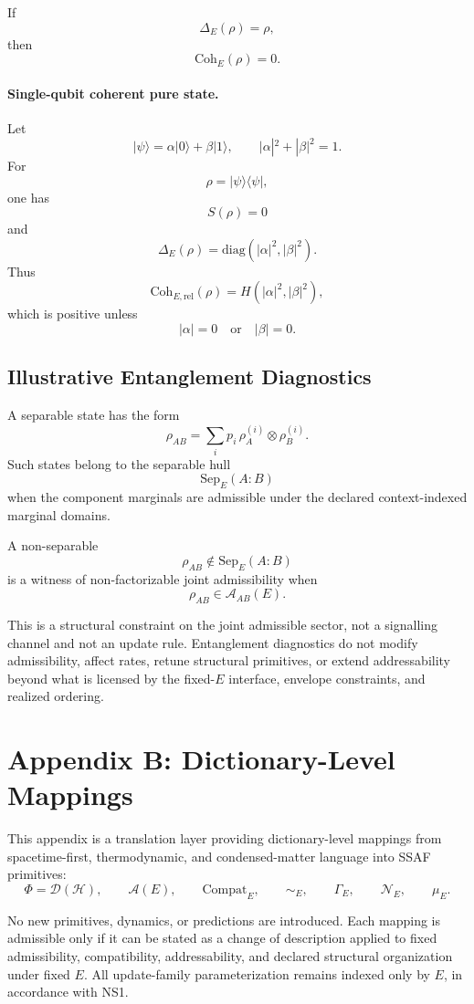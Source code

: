 \documentclass[aps,prx,onecolumn,11pt]{revtex4-2}
\theoremstyle{plain}
\theoremstyle{definition}
\theoremstyle{remark}
\begin{document}
If
\[
\Delta_E(\rho)=\rho,
\]
then
\[
\mathrm{Coh}_E(\rho)=0.
\]

\paragraph{Single-qubit coherent pure state.}

Let
\[
|\psi\rangle
=
\alpha|0\rangle+\beta|1\rangle,
\qquad
|\alpha|^2+|\beta|^2=1.
\]
For
\[
\rho=|\psi\rangle\langle\psi|,
\]
one has
\[
S(\rho)=0
\]
and
\[
\Delta_E(\rho)
=
\mathrm{diag}(|\alpha|^2,|\beta|^2).
\]
Thus
\[
\mathrm{Coh}_{E,\mathrm{rel}}(\rho)
=
H(|\alpha|^2,|\beta|^2),
\]
which is positive unless
\[
|\alpha|=0
\quad\text{or}\quad
|\beta|=0.
\]

\subsection{Illustrative Entanglement Diagnostics}
\label{appA:entanglement_diagnostics}

A separable state has the form
\[
\rho_{AB}
=
\sum_i p_i\,
\rho_A^{(i)}\otimes\rho_B^{(i)}.
\]
Such states belong to the separable hull
\[
\mathrm{Sep}_E(A{:}B)
\]
when the component marginals are admissible under the declared
context-indexed marginal domains.

A non-separable
\[
\rho_{AB}\notin\mathrm{Sep}_E(A{:}B)
\]
is a witness of non-factorizable joint admissibility when
\[
\rho_{AB}\in\mathcal A_{AB}(E).
\]

This is a structural constraint on the joint admissible sector, not a
signalling channel and not an update rule. Entanglement diagnostics do
not modify admissibility, affect rates, retune structural primitives, or
extend addressability beyond what is licensed by the fixed-\(E\)
interface, envelope constraints, and realized ordering.

\section{Appendix B: Dictionary-Level Mappings}
\label{appB:dictionary_mappings}

This appendix is a translation layer providing dictionary-level mappings
from spacetime-first, thermodynamic, and condensed-matter language into
SSAF primitives:
\[
\Phi=\mathcal D(\mathcal H),
\qquad
\mathcal A(E),
\qquad
\mathrm{Compat}_E,
\qquad
\sim_E,
\qquad
\Gamma_E,
\qquad
\mathcal N_E,
\qquad
\mu_E.
\]

No new primitives, dynamics, or predictions are introduced. Each mapping
is admissible only if it can be stated as a change of description
applied to fixed admissibility, compatibility, addressability, and
declared structural organization under fixed \(E\). All update-family
parameterization remains indexed only by \(E\), in accordance with NS1.
\end{document}
